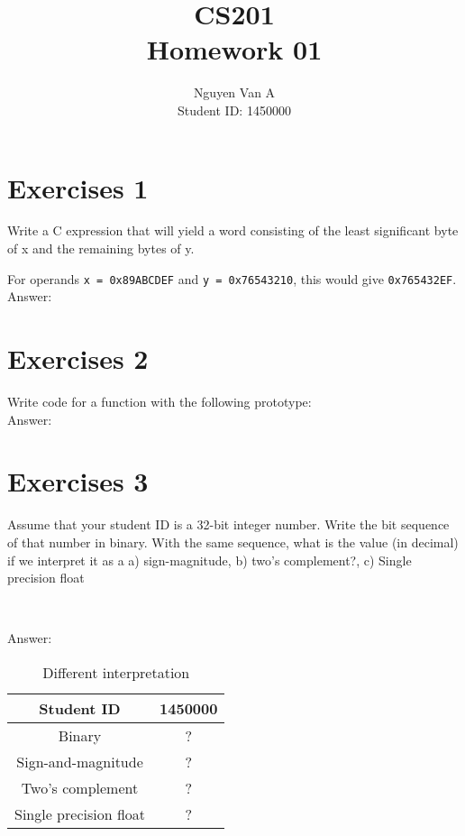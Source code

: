 \documentclass[a4paper]{article}
\begin{document}
\author{Nguyen Van A \\ Student ID: 1450000} %
\title{CS201\\Homework 01}
\maketitle


\setcounter{page}{1}
\tableofcontents
{}

\clearpage


\section{Exercises 1}
Write a C expression that will yield a word consisting of the least significant byte of x and the remaining bytes of y.

For operands \texttt{x = 0x89ABCDEF} and \texttt{y = 0x76543210}, this would give \texttt{0x765432EF}.\\[1pt]

Answer: %


\section{Exercises 2}
Write code for a function with the following prototype:\\[1pt]

Answer: %


\section{Exercises 3}
Assume that your student ID is a 32-bit integer number. Write the bit sequence of that number in binary. With the same sequence, what is the value (in decimal) if we interpret it as a a) sign-magnitude, b) two's complement?, c) Single precision float

~\newline

Answer: %

\begin{table}[h]
\begin{center}
\begin{tabular}{|c|c|}
\hline
Student ID & 1450000 \\
\hline
Binary & ? \\
\hline
Sign-and-magnitude & ? \\
\hline
Two's complement & ? \\
\hline
Single precision float & ?\\
\hline

\end{tabular}
\caption{Different interpretation}
\end{center}
\end{table}
\end{document}
